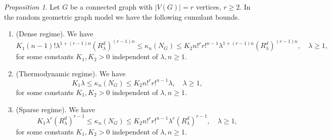 \documentclass[bj,authoryear,noshowframe]{imsart}
\theoremstyle{plain}
\theoremstyle{remark}
\newtheorem{prop}{Proposition}[section]
\begin{document}
\begin{prop}
    \label{thm8}
 Let $G$ be a connected graph with $|V(G)|=r$ vertices, $r\geq 2$.
 In the random geometric graph model we have the following cumulant bounds. 
 \begin{enumerate}%
 \item (Dense regime). 
   We have
   \begin{equation}
     \label{b1}
     K_1 (n-1)! \lambda^{1+(r-1)n} ( R_\lambda^d)^{(r-1)n}
     \leq \kappa_n(N_G) \leq K_2 n!^r r!^{n-1}
 \lambda^{1+(r-1)n} ( R_\lambda^d)^{(r-1)n}, 
 \quad \lambda \geq 1,
   \end{equation}
for some constants $K_1, K_2 > 0$ independent
of $\lambda , n\geq 1$. 
  \item (Thermodynamic regime). 
   We have
   \begin{equation}
\label{b2}
K_1 \lambda \leq \kappa_n(N_G)\leq K_2 n!^r r!^{n-1}\lambda,
  \quad \lambda \geq 1, 
\end{equation}
for some constants $K_1, K_2 > 0$ independent
of $\lambda , n\geq 1$. 
  \item (Sparse regime). 
   We have
   \begin{equation}
 \label{b3}
         K_1 \lambda^r ( R_\lambda^d)^{r-1} 
     \leq \kappa_n(N_G)\leq K_2 n!^r r!^{n-1} \lambda^r (R_\lambda^d)^{r-1},
     \quad \lambda \geq 1,
   \end{equation}
for some constants $K_1, K_2 > 0$ independent
of $\lambda , n\geq 1$. 
 \end{enumerate}
\end{prop}
\end{document}
